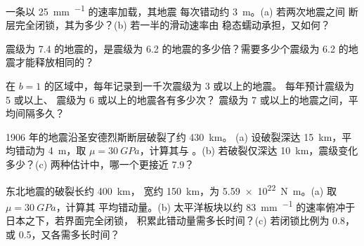 \begin{exercise}[$\star$]\label{exo:b1:earthquake-source:2}
一条以 \qty{25}{mm.^{-1}} 的速率加载，其地震
每次错动约 \qty{3}{m}。(a) 若两次地震之间
断层完全闭锁，其为多少？(b) 若一半的滑动速率由
稳态蠕动承担，又如何？
\end{exercise}

\begin{exercise}[$\star$]\label{exo:b1:earthquake-source:3}
震级为 7.4 的地震的，是震级为
6.2 的地震的多少倍？需要多少个震级为
6.2 的地震才能释放相同的？
\end{exercise}

\begin{exercise}[$\star$]\label{exo:b1:earthquake-source:4}
在 $b = 1$ 的区域中，每年记录到一千次震级为 3 或以上的地震。
每年预计震级为 5 或以上、
震级为 6 或以上的地震各有多少次？
震级为 7 或以上的地震之间，平均间隔多久？
\end{exercise}

\begin{exercise}[$\star\star$]\label{exo:b1:earthquake-source:5}
1906 年的地震沿圣安德烈斯断层破裂了约 \qty{430}{km}。
(a) 设破裂深达 \qty{15}{km}，平均错动为
\qty{4}{m}，取 $\mu = \qty{30}{GPa}$，计算其与
。(b) 若破裂仅深达
\qty{10}{km}，震级变化多少？(c) 两种估计中，哪一个更接近 7.9？
\end{exercise}

\begin{exercise}[$\star\star$]\label{exo:b1:earthquake-source:6}
东北地震的破裂长约 \qty{400}{km}，
宽约 \qty{150}{km}，为 \qty{5.59e22}{N.m}。(a) 取 $\mu = \qty{30}{GPa}$，计算其
平均错动量。(b) 太平洋板块以约
\qty{83}{mm.^{-1}} 的速率俯冲于日本之下，若界面完全闭锁，
积累此错动量需多长时间？(c) 若闭锁比例为 0.8，
或 0.5，又各需多长时间？
\end{exercise}

